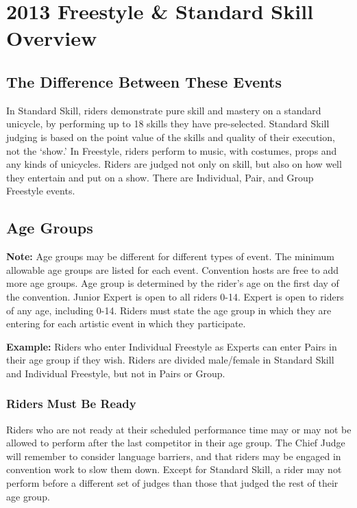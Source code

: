 \chapter{2013 Freestyle \& Standard Skill \label{chap:freestyle} Overview}

\section{The Difference Between These Events}
In Standard Skill, riders demonstrate pure skill and mastery on a standard unicycle, by performing up to 18 skills they have pre-selected.
Standard Skill judging is based on the point value of the skills and quality of their execution, not the `show.' In Freestyle, riders perform to music, with costumes, props and any kinds of unicycles.
Riders are judged not only on skill, but also on how well they entertain and put on a show.
There are Individual, Pair, and Group Freestyle events.

\section{Age Groups}
\textbf{Note:} Age groups may be different for different types of event.
The minimum allowable age groups are listed for each event.
Convention hosts are free to add more age groups.
Age group is determined by the rider's age on the first day of the convention.
Junior Expert is open to all riders 0-14.
Expert is open to riders of any age, including 0-14.
Riders must state the age group in which they are entering for each artistic event in which they participate.

\textbf{Example:} Riders who enter Individual Freestyle as Experts can enter Pairs in their age group if they wish.
Riders are divided male/female in Standard Skill and Individual Freestyle, but not in Pairs or Group.

\subsection{Riders Must Be Ready}
Riders who are not ready at their scheduled performance time may or may not be allowed to perform after the last competitor in their age group.
The Chief Judge will remember to consider language barriers, and that riders may be engaged in convention work to slow them down.
Except for Standard Skill, a rider may not perform before a different set of judges than those that judged the rest of their age group.

